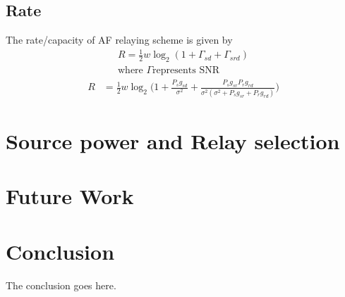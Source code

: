 \documentclass[conference]{IEEEtran}
\begin{document}
\subsection{Rate}
The rate/capacity of AF relaying scheme is given by
\begin{align*}
	R = \frac{1}{2} w \log_2(1+\Gamma_{sd}+\Gamma_{srd}) 
	\\ \text{where $\Gamma$
represents SNR}
\end{align*}
\begin{align*}
	R &= \frac{1}{2} w \log_2\bigg(1+\frac{P_s g_{sd}}{\sigma^2} +
	\frac{P_s g_{sr} P_r g_{rd}}{\sigma^2(\sigma^2 + P_sg_{sr} + P_rg_{rd})}\bigg)
\end{align*}

\section{Source power and Relay selection}
\section{Future Work}
\section{Conclusion} The conclusion goes here.










%




\end{document}
